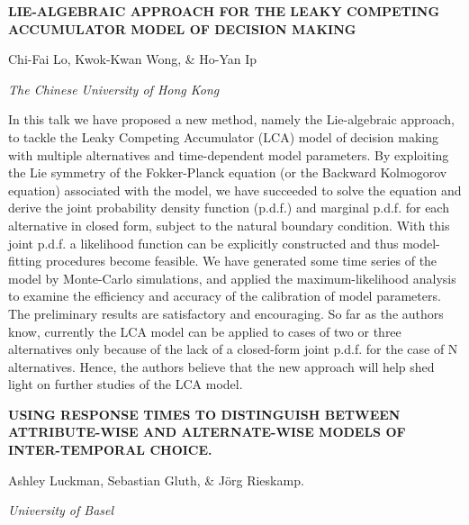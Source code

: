 \documentclass[]{article}
\begin{document}
\textbf{LIE-ALGEBRAIC APPROACH FOR THE LEAKY COMPETING ACCUMULATOR MODEL
OF DECISION MAKING}

Chi-Fai Lo, Kwok-Kwan Wong, \& Ho-Yan Ip

\emph{The Chinese University of Hong Kong}

In this talk we have proposed a new method, namely the Lie-algebraic
approach, to tackle the Leaky Competing Accumulator (LCA) model of
decision making with multiple alternatives and time-dependent model
parameters. By exploiting the Lie symmetry of the Fokker-Planck equation
(or the Backward Kolmogorov equation) associated with the model, we have
succeeded to solve the equation and derive the joint probability density
function (p.d.f.) and marginal p.d.f. for each alternative in closed
form, subject to the natural boundary condition. With this joint p.d.f.
a likelihood function can be explicitly constructed and thus
model-fitting procedures become feasible. We have generated some time
series of the model by Monte-Carlo simulations, and applied the
maximum-likelihood analysis to examine the efficiency and accuracy of
the calibration of model parameters. The preliminary results are
satisfactory and encouraging. So far as the authors know, currently the
LCA model can be applied to cases of two or three alternatives only
because of the lack of a closed-form joint p.d.f. for the case of N
alternatives. Hence, the authors believe that the new approach will help
shed light on further studies of the LCA model.

\textbf{USING RESPONSE TIMES TO DISTINGUISH BETWEEN ATTRIBUTE-WISE AND
ALTERNATE-WISE MODELS OF INTER-TEMPORAL CHOICE.}

Ashley Luckman, Sebastian Gluth, \& Jörg Rieskamp.

\emph{University of Basel}
\end{document}
